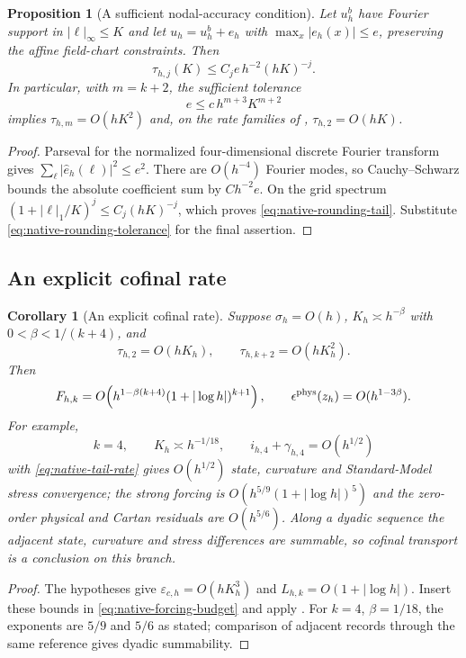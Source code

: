 \documentclass[11pt]{article}
\numberwithin{equation}{section}
\newtheorem{proposition}[proposition]{Proposition}
\newtheorem{corollary}[corollary]{Corollary}
\theoremstyle{definition}
\theoremstyle{remark}
\begin{document}
\begin{proposition}[A sufficient nodal-accuracy condition]
\label{prop:native-rounding}
Let $u_h^b$ have Fourier support in $|\ell|_\infty\le K$ and let $u_h=u_h^b+e_h$ with $\max_x|e_h(x)|\le e$, preserving the affine field-chart constraints.  Then
\begin{equation}
 \tau_{h,j}(K)\le C_j e\,h^{-2}(hK)^{-j}.
 \label{eq:native-rounding-tail}
\end{equation}
In particular, with $m=k+2$, the sufficient tolerance
\begin{equation}
 e\le c\,h^{m+3}K^{m+2}
 \label{eq:native-rounding-tolerance}
\end{equation}
implies $\tau_{h,m}=O(hK^2)$ and, on the rate families of , $\tau_{h,2}=O(hK)$.
\end{proposition}
\begin{proof}
Parseval for the normalized four-dimensional discrete Fourier transform gives $\sum_\ell|\widehat e_h(\ell)|^2\le e^2$.  There are $O(h^{-4})$ Fourier modes, so Cauchy--Schwarz bounds the absolute coefficient sum by $Ch^{-2}e$.  On the grid spectrum $(1+|\ell|_1/K)^j\le C_j(hK)^{-j}$, which proves \eqref{eq:native-rounding-tail}.  Substitute \eqref{eq:native-rounding-tolerance} for the final assertion.
\end{proof}

\subsection{An explicit cofinal rate}

\begin{corollary}[An explicit cofinal rate]
\label{cor:native-rate}
Suppose $\sigma_h=O(h)$, $K_h\asymp h^{-\beta}$ with $0<\beta<1/(k+4)$, and
\begin{equation}
 \tau_{h,2}=O(hK_h),\qquad
 \tau_{h,k+2}=O(hK_h^2).
 \label{eq:native-tail-rate}
\end{equation}
Then
\[
 F_{h,k}=O\!\left(h^{1-\beta(k+4)}(1+|\log h|)^{k+1}\right),
 \qquad
 \epsilon^{\rm phys}(z_h)=O(h^{1-3\beta}).
\]
For example,
\begin{equation}
 k=4,\qquad K_h\asymp h^{-1/18},\qquad
 i_{h,4}+\gamma_{h,4}=O(h^{1/2})
 \label{eq:native-example-rate}
\end{equation}
with \eqref{eq:native-tail-rate} gives $O(h^{1/2})$ state, curvature and Standard-Model stress convergence; the strong forcing is $O(h^{5/9}(1+|\log h|)^5)$ and the zero-order physical and Cartan residuals are $O(h^{5/6})$.  Along a dyadic sequence the adjacent state, curvature and stress differences are summable, so cofinal transport is a conclusion on this branch.
\end{corollary}
\begin{proof}
The hypotheses give $\varepsilon_{c,h}=O(hK_h^3)$ and
$L_{h,k}=O(1+|\log h|)$. Insert these bounds in
\eqref{eq:native-forcing-budget} and apply .
For $k=4$, $\beta=1/18$, the exponents are $5/9$ and $5/6$ as stated;
comparison of adjacent records through the same reference gives dyadic
summability.
\end{proof}
\end{document}
